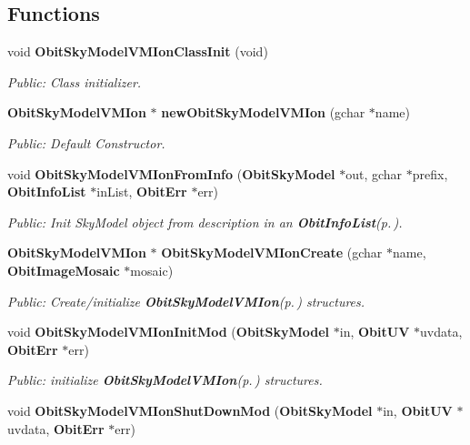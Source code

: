 \subsection*{Functions}
\begin{CompactItemize}
\item 
void {\bf Obit\-Sky\-Model\-VMIon\-Class\-Init} (void)
\begin{CompactList}\small\item\em Public: Class initializer. \item\end{CompactList}\item 
{\bf Obit\-Sky\-Model\-VMIon} $\ast$ {\bf new\-Obit\-Sky\-Model\-VMIon} (gchar $\ast$name)
\begin{CompactList}\small\item\em Public: Default Constructor. \item\end{CompactList}\item 
void {\bf Obit\-Sky\-Model\-VMIon\-From\-Info} ({\bf Obit\-Sky\-Model} $\ast$out, gchar $\ast$prefix, {\bf Obit\-Info\-List} $\ast$in\-List, {\bf Obit\-Err} $\ast$err)
\begin{CompactList}\small\item\em Public: Init Sky\-Model object from description in an {\bf Obit\-Info\-List}{\rm (p.\,\pageref{structObitInfoList})}. \item\end{CompactList}\item 
{\bf Obit\-Sky\-Model\-VMIon} $\ast$ {\bf Obit\-Sky\-Model\-VMIon\-Create} (gchar $\ast$name, {\bf Obit\-Image\-Mosaic} $\ast$mosaic)
\begin{CompactList}\small\item\em Public: Create/initialize {\bf Obit\-Sky\-Model\-VMIon}{\rm (p.\,\pageref{structObitSkyModelVMIon})} structures. \item\end{CompactList}\item 
void {\bf Obit\-Sky\-Model\-VMIon\-Init\-Mod} ({\bf Obit\-Sky\-Model} $\ast$in, {\bf Obit\-UV} $\ast$uvdata, {\bf Obit\-Err} $\ast$err)
\begin{CompactList}\small\item\em Public: initialize {\bf Obit\-Sky\-Model\-VMIon}{\rm (p.\,\pageref{structObitSkyModelVMIon})} structures. \item\end{CompactList}\item 
void {\bf Obit\-Sky\-Model\-VMIon\-Shut\-Down\-Mod} ({\bf Obit\-Sky\-Model} $\ast$in, {\bf Obit\-UV} $\ast$uvdata, {\bf Obit\-Err} $\ast$err)

\end{CompactItemize}
